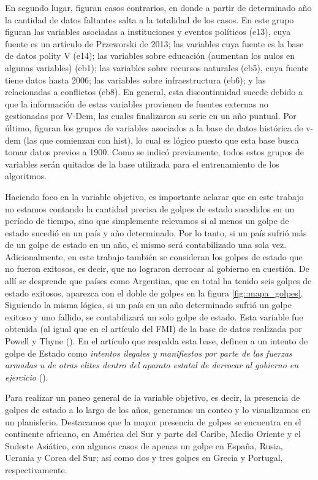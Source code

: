 \documentclass{article}
\begin{document}
En segundo lugar, figuran casos contrarios, en donde a partir de determinado año
la cantidad de datos faltantes salta a la totalidad de los casos. En este grupo
figuran las variables asociadas a instituciones y eventos políticos (e13), cuya 
fuente es un artículo de Przeworski de 2013; las variables cuya fuente es la base
de datos polity V (e14); las variables sobre educación (aumentan los nulos en 
algunas variables) (eb1); las variables sobre recursos naturales (eb5), cuya fuente 
tiene datos hasta 2006; las variables sobre infraestructura (eb6); y las relacionadas 
a conflictos (eb8). En general, esta discontinuidad sucede debido a que la 
información de estas variables provienen de fuentes externas no gestionadas por 
V-Dem, las cuales finalizaron su serie en un año puntual. Por último, figuran los 
grupos de variables asociados a la base de datos histórica de v-dem (las que comienzan 
con hist), lo cual es lógico puesto que esta base busca tomar datos previos a 1900.
Como se indicó previamente, todos estos grupos de variables serán quitados de la base
utilizada para el entrenamiento de los algoritmos.

Haciendo foco en la variable objetivo, es importante aclarar que en este trabajo no 
estamos contando la cantidad precisa
de golpes de estado sucedidos en un período de tiempo, sino que simplemente relevamos
si al menos un golpe de estado sucedió en un país y año determinado. Por lo tanto, si
un país sufrió más de un golpe de estado en un año, el mismo será contabilizado una
sola vez. Adicionalmente, en este trabajo también se consideran los golpes de estado
que no fueron exitosos, es decir, que no lograron derrocar al gobierno en cuestión. 
De allí se desprende que países como Argentina, que en total ha tenido seis golpes de 
estado exitosos, aparezca con el doble de golpes en la figura \ref{fig::mapa_golpes}.
Siguiendo la misma lógica, si un país en un año determinado sufrió un golpe exitoso y 
uno fallido, se contabilizará un solo golpe de estado.
Esta variable fue obtenida (al igual que en el artículo del FMI) de la base de datos
realizada por Powell y Thyne (\citeyear{Pow11}). En el artículo que respalda esta base, 
definen a un intento de golpe de Estado como \textit{intentos ilegales y manifiestos por parte 
de las fuerzas armadas u de otras elites dentro del aparato estatal de derrocar al 
gobierno en ejercicio} (\cite[p.~252]{Pow11}).

Para realizar un paneo general de la variable objetivo, es decir, la presencia de
golpes de estado a lo largo de los años, generamos un conteo y lo visualizamos en un 
planisferio. Destacamos que la mayor presencia de golpes se encuentra en el 
continente africano, en América del Sur y parte del Caribe, Medio Oriente y el 
Sudeste Asiático, con algunos casos de apenas un golpe en España, Rusia, Ucrania 
y Corea del Sur; así como dos y tres golpes en Grecia y Portugal, respectivamente.
\end{document}
